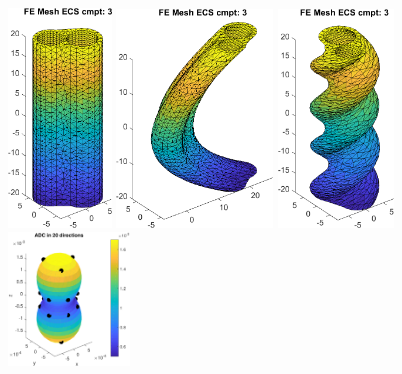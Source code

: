 \documentclass[a4paper]{article}
\begin{document}
\begin{figure}[!ht]
    \centering
    \includegraphics[width=0.2448\textwidth]{plot_femesh/2cyl_ecs_canonical.png} \quad\quad
    \includegraphics[width=0.37\textwidth]{plot_femesh/2cyl_ecs_bend.png} \quad\quad
    \includegraphics[width=0.2725\textwidth]{plot_femesh/2cyl_ecs_twist.png} \\
    \vspace{0.5cm}
    \includegraphics[width=0.2874\textwidth]{adc_alldir/none.pdf}

\end{figure}
\end{document}
